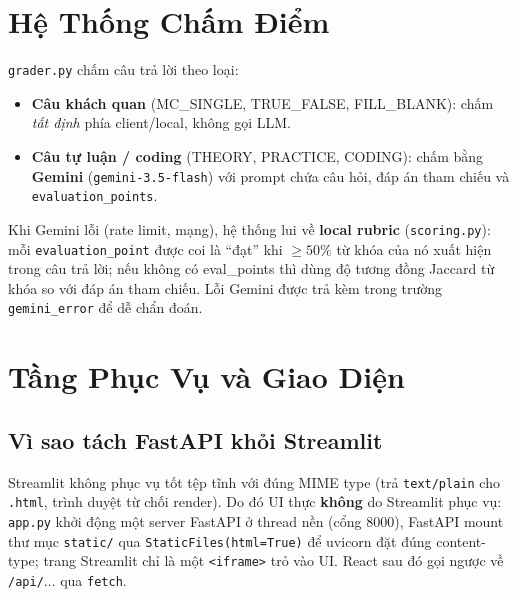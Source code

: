 \section{Hệ Thống Chấm Điểm}
\label{sec:grading}

\texttt{grader.py} chấm câu trả lời theo loại:
\begin{itemize}[leftmargin=1.3em]
  \item \textbf{Câu khách quan} (MC\_SINGLE, TRUE\_FALSE, FILL\_BLANK): chấm \textit{tất định} phía client/local, không gọi LLM.
  \item \textbf{Câu tự luận / coding} (THEORY, PRACTICE, CODING): chấm bằng \textbf{Gemini} (\texttt{gemini-3.5-flash}) với prompt chứa câu hỏi, đáp án tham chiếu và \texttt{evaluation\_points}.
\end{itemize}
Khi Gemini lỗi (rate limit, mạng), hệ thống lui về \textbf{local rubric} (\texttt{scoring.py}): mỗi \texttt{evaluation\_point} được coi là ``đạt'' khi $\geq 50\%$ từ khóa của nó xuất hiện trong câu trả lời; nếu không có eval\_points thì dùng độ tương đồng Jaccard từ khóa so với đáp án tham chiếu. Lỗi Gemini được trả kèm trong trường \texttt{gemini\_error} để dễ chẩn đoán.

\section{Tầng Phục Vụ và Giao Diện}
\label{sec:serving}

\subsection{Vì sao tách FastAPI khỏi Streamlit}
Streamlit không phục vụ tốt tệp tĩnh với đúng MIME type (trả \texttt{text/plain} cho \texttt{.html}, trình duyệt từ chối render). Do đó UI thực \textbf{không} do Streamlit phục vụ: \texttt{app.py} khởi động một server FastAPI ở thread nền (cổng 8000), FastAPI mount thư mục \texttt{static/} qua \texttt{StaticFiles(html=True)} để uvicorn đặt đúng content-type; trang Streamlit chỉ là một \texttt{<iframe>} trỏ vào UI. React sau đó gọi ngược về \texttt{/api/$\ldots$} qua \texttt{fetch}.

